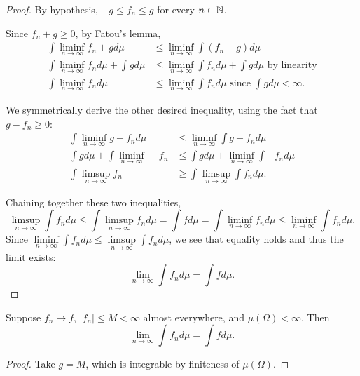 \begin{proof}
	By hypothesis, $-g \le f_n \le g$ for every $n \in \mathbb{N}$.

	Since $f_n + g \ge 0$, by Fatou's lemma, \begin{align*}
		\int \liminf\limits_{n \to \infty} f_n + g d\mu &\le \liminf\limits_{n \to \infty} \int (f_n + g)d\mu \\
		\int \liminf\limits_{n \to \infty} f_n d\mu + \int gd\mu &\le \liminf\limits_{n \to \infty} \int f_n d\mu + \int gd\mu \text{ by linearity} \\
		\int \liminf\limits_{n \to \infty} f_n d\mu &\le \liminf\limits_{n \to \infty} \int f_n d\mu \text{ since } \int gd\mu < \infty
	.\end{align*}

	We symmetrically derive the other desired inequality, using the fact that $g - f_n \ge 0$:
	\begin{align*}
		\int \liminf\limits_{n \to \infty} g - f_n d\mu &\le \liminf\limits_{n \to \infty} \int g - f_n d\mu \\
		\int gd\mu + \int \liminf\limits_{n \to \infty} -f_n &\le \int gd\mu + \liminf\limits_{n \to \infty} \int -f_n d\mu \\
		\int \limsup\limits_{n \to \infty} f_n &\ge \int_{}^{} \limsup\limits_{n \to \infty} \int f_n d\mu 
	.\end{align*}
	
	Chaining together these two inequalities, \[
		\limsup\limits_{n \to \infty} \int f_n d\mu \le \int \limsup\limits_{n \to \infty} f_n d\mu = \int  fd\mu = \int \liminf\limits_{n \to \infty} f_n d\mu \le \liminf\limits_{n \to \infty} \int f_n d\mu
	.\] 
	Since $\liminf\limits_{n \to \infty} \int f_n d\mu \le \limsup\limits_{n \to \infty} \int f_n d\mu$, we see that equality holds and thus the limit exists: \[
		\lim\limits_{n \to \infty} \int f_n d\mu = \int fd\mu
	.\] 
\end{proof}
\begin{corollary}
	Suppose $f_n \to f$, $\left| f_n \right| \le M < \infty$ almost everywhere, and $\mu(\Omega) < \infty$. Then \[
		\lim\limits_{n \to \infty} \int f_n d\mu = \int f d\mu
	.\] 
\end{corollary}
\begin{proof}
	Take $g = M$, which is integrable by finiteness of $\mu(\Omega)$.
\end{proof}
